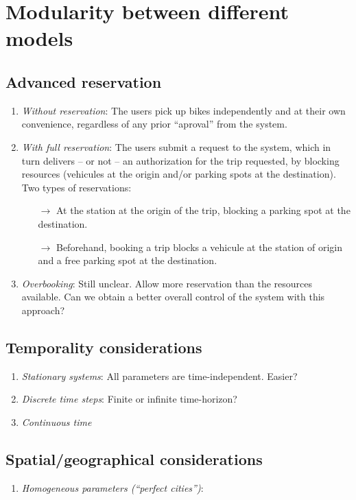 \section{Modularity between different models}

\subsection{Advanced reservation}
\begin{enumerate}
\item {\em Without reservation}: The users pick up bikes independently and at their own convenience, regardless of any prior ``aproval'' from the system.
\item {\em With full reservation}: The users submit a request to the system, which in turn delivers -- or not -- an authorization for the trip requested, by blocking resources (vehicules at the origin and/or parking spots at the destination).
Two types of reservations: 
\begin{itemize}
\item[$\rightarrow$] At the station at the origin of the trip, blocking a parking spot at the destination.
\item[$\rightarrow$] Beforehand, booking a trip blocks a vehicule at the station of origin and a free parking spot at the destination.
\end{itemize}
\item {\em Overbooking}: Still unclear. Allow more reservation than the resources available. Can we obtain a better overall control of the system with this approach?
\end{enumerate}

\subsection{Temporality considerations}
\begin{enumerate}
\item {\em Stationary systems}: All parameters are time-independent. Easier?
\item {\em Discrete time steps}: Finite or infinite time-horizon?
\item {\em Continuous time}
\end{enumerate}

\subsection{Spatial/geographical considerations}
\begin{enumerate}
\item {\em Homogeneous parameters (``perfect cities'')}: 
\end{enumerate}
